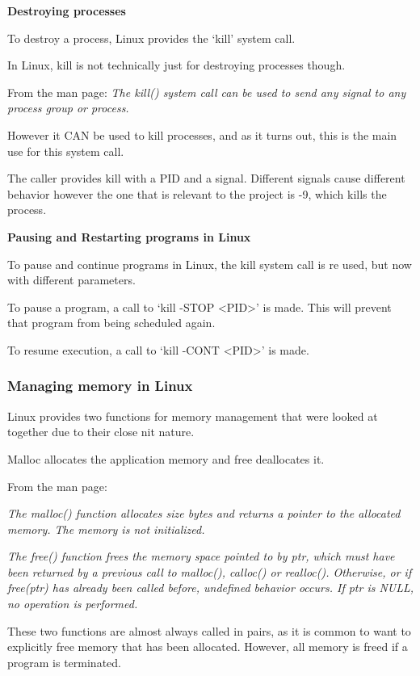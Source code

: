 \documentclass[a4paper]{report}
\begin{document}
\textbf{Destroying processes}

To destroy a process, Linux provides the `kill' system call.

In Linux, kill is not technically just for destroying processes though.

From the man page:
\textit{The kill() system call can be used to send any signal to any process group or process.}\cite{manKill}

However it CAN be used to kill processes, and as it turns out, this is the main use for this system call.

The caller provides kill with a PID and a signal. Different signals cause different behavior however the one that is relevant to the project is -9, which kills the process.


\textbf{Pausing and Restarting programs in Linux}

To pause and continue programs in Linux, the kill system call is re used, but now with different parameters.

To pause a program, a call to `kill -STOP \textless PID\textgreater' is made. This will prevent that program from being scheduled again.

To resume execution, a call to `kill -CONT \textless PID\textgreater' is made.



\subsubsection*{Managing memory in Linux}

Linux provides two functions for memory management that were looked at together due to their close nit nature.

Malloc allocates the application memory and free deallocates it.

From the man page:

\textit{The malloc() function allocates size bytes and returns a pointer to the allocated memory.  The memory is not initialized.}

\textit{The free() function frees the memory space pointed  to  by  ptr,  which must  have  been  returned  by a previous call to malloc(), calloc() or realloc().  Otherwise, or if free(ptr) has already been called  before, undefined behavior occurs.  If ptr is NULL, no operation is performed.} \cite{manMalloc}

These two functions are almost always called in pairs, as it is common to want to explicitly free memory that has been allocated. However, all memory is freed if a program is terminated.
\end{document}
